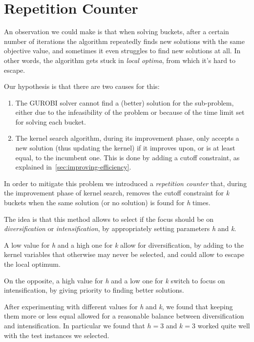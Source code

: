 

\section{Repetition Counter}
An observation we could make is that when solving buckets,
after a certain number of iterations the algorithm
repeatedly finds new solutions with the same objective value,
and sometimes it even struggles to find new solutions at all.
In other words, the algorithm gets stuck in \textit{local optima},
from which it's hard to escape.

Our hypothesis is that there are two causes for this:
\begin{enumerate}
    \item The GUROBI solver cannot find a (better) solution for the sub-problem,
    either due to the infeasibility of the problem or because of
    the time limit set for solving each bucket.
    \item The kernel search algorithm, during its improvement phase,
    only accepts a new solution (thus updating the kernel)
    if it improves upon, or is at least equal, to the incumbent one.
    This is done by adding a cutoff constraint, as explained in~\ref{sec:improving-efficiency}.
\end{enumerate}

In order to mitigate this problem we introduced a \textit{repetition counter}
that, during the improvement phase of kernel search,
removes the cutoff constraint for \textit{k} buckets
when the same solution (or no solution) is found for \textit{h} times.

The idea is that this method allows to select if the focus should be on
\textit{diversification} or \textit{intensification},
by appropriately setting parameters \textit{h} and \textit{k}.

A low value for \textit{h} and a high one for \textit{k} allow for
diversification, by adding to the kernel variables that otherwise
may never be selected, and could allow to escape the local optimum.

On the opposite, a high value for \textit{h} and a low one for \textit{k}
switch to focus on intensification, by giving priority to finding
better solutions.

After experimenting with different values for \textit{h} and \textit{k},
we found that keeping them more or less equal allowed for
a reasonable balance between diversification and intensification.
In particular we found that \(h=3\) and \(k=3\) worked quite well
with the test instances we selected.

